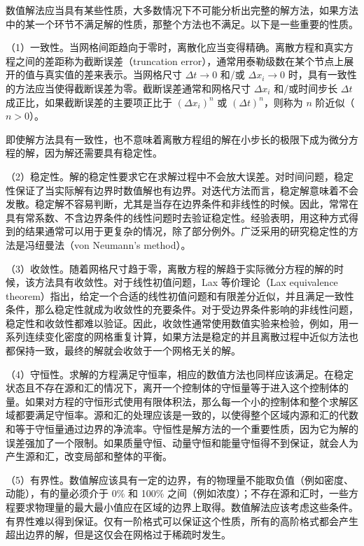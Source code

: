 数值解法应当具有某些性质，大多数情况下不可能分析出完整的解方法，如果方法中的某一个环节不满足解的性质，那整个方法也不满足。以下是一些重要的性质。

（1）一致性。当网格间距趋向于零时，离散化应当变得精确。离散方程和真实方程之间的差距称为截断误差（truncation error），通常用泰勒级数在某个节点上展开的值与真实值的差来表示。当网格尺寸 $\Delta t \to 0$ 和/或 $\Delta x_i \to 0$ 时，具有一致性的方法应当使得截断误差为零。截断误差通常和网格尺寸 $\Delta x_i$ 和/或时间步长 $\Delta t$ 成正比，如果截断误差的主要项正比于 $(\Delta x_i)^n$ 或 $(\Delta t)^n$，则称为 $n$ 阶近似（$n>0$）。%

即使解方法具有一致性，也不意味着离散方程组的解在小步长的极限下成为微分方程的解，因为解还需要具有稳定性。

（2）稳定性。解的稳定性要求它在求解过程中不会放大误差。对时间问题，稳定性保证了当实际解有边界时数值解也有边界。对迭代方法而言，稳定解意味着不会发散。稳定解不容易判断，尤其是当存在边界条件和非线性的时候。因此，常常在具有常系数、不含边界条件的线性问题时去验证稳定性。经验表明，用这种方式得到的结果通常可以用于更复杂的情况，除了部分例外。广泛采用的研究稳定性的方法是冯纽曼法（von Neumann's method）。

（3）收敛性。随着网格尺寸趋于零，离散方程的解趋于实际微分方程的解的时候，该方法具有收敛性。对于线性初值问题，Lax 等价理论（Lax equivalence theorem）\cite{}指出，给定一个合适的线性初值问题和有限差分近似，并且满足一致性条件，那么稳定性就成为收敛性的充要条件。对于受边界条件影响的非线性问题，稳定性和收敛性都难以验证。因此，收敛性通常使用数值实验来检验，例如，用一系列连续变化密度的网格重复计算，如果方法是稳定的并且离散过程中近似方法也都保持一致，最终的解就会收敛于一个网格无关的解。

（4）守恒性。求解的方程满足守恒率，相应的数值方法也同样应该满足。在稳定状态且不存在源和汇的情况下，离开一个控制体的守恒量等于进入这个控制体的量。如果对方程的守恒形式使用有限体积法，那么每一个小的控制体和整个求解区域都要满足守恒率。源和汇的处理应该是一致的，以使得整个区域内源和汇的代数和等于守恒量通过边界的净流率。守恒性是解方法的一个重要性质，因为它为解的误差强加了一个限制。如果质量守恒、动量守恒和能量守恒得不到保证，就会人为产生源和汇，改变局部和整体的平衡。

（5）有界性。数值解应该具有一定的边界，有的物理量不能取负值（例如密度、动能），有的量必须介于 0\% 和 100\% 之间（例如浓度）；不存在源和汇时，一些方程要求物理量的最大最小值应在区域的边界上取得。数值解法应该考虑这些条件。有界性难以得到保证。仅有一阶格式可以保证这个性质，所有的高阶格式都会产生超出边界的解，但是这仅会在网格过于稀疏时发生。


